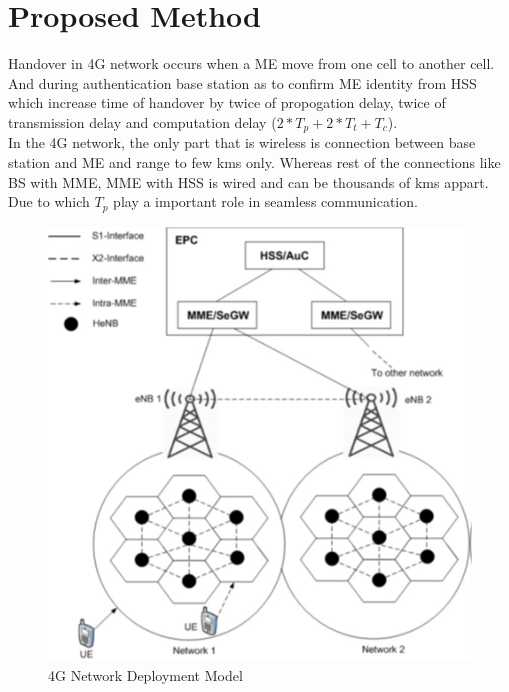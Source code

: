 \chapter{Proposed Method}

{
    Handover in 4G network occurs when a ME move from one cell to another cell.
    And during authentication base station as to confirm ME identity from HSS which
    increase time of handover by twice of propogation delay, twice of transmission delay
    and computation delay (\(2*T_p +2*T_t + T_{c}\)).\\



    In the 4G network, the only part that is wireless is connection between base station
    and ME and range to few kms only. Whereas rest of the connections like BS with MME, 
    MME with HSS is wired and can be thousands of kms appart. Due to which \(T_p\) play a 
    important role in seamless communication.

    \begin{figure}[ht]
        \centering
        \includegraphics[scale=0.6]{img/celll.png}
        \caption{4G Network Deployment Model}
    \end{figure}

}
